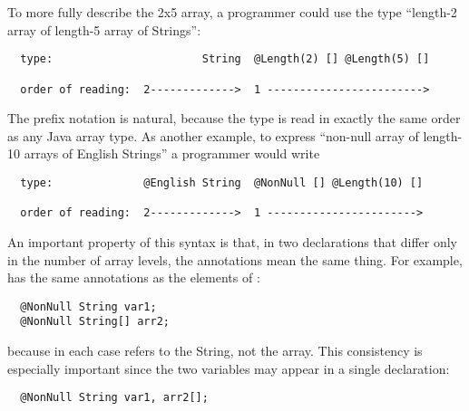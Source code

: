 \documentclass[10pt]{article}
\begin{document}


To more fully describe the 2x5 array, a programmer could use the
type ``length-2 array of length-5 array of Strings'':

\begin{Verbatim}
  type:                       String  @Length(2) [] @Length(5) []

  order of reading:  2------------->  1 ------------------------>
\end{Verbatim}

The prefix notation is natural, because the type is read in exactly
the same order as any Java array type.  As another example, to express
``non-null array of length-10 arrays of English Strings'' a programmer
would write

\begin{Verbatim}
  type:              @English String  @NonNull [] @Length(10) []

  order of reading:  2------------->  1 ----------------------->
\end{Verbatim}




An important property of this syntax is that, in two declarations that
differ only in the number of array levels, the annotations mean the same
thing.  For example,  has
the same annotations as the elements of :

\preverbnegspace
\begin{Verbatim}
  @NonNull String var1;
  @NonNull String[] arr2;
\end{Verbatim}

\noindent
because in each case  refers to the String, not the array.
This consistency is especially important since the two variables may appear in a single
declaration:

\preverbnegspace
\begin{Verbatim}
  @NonNull String var1, arr2[];
\end{Verbatim}

% 
\end{document}
